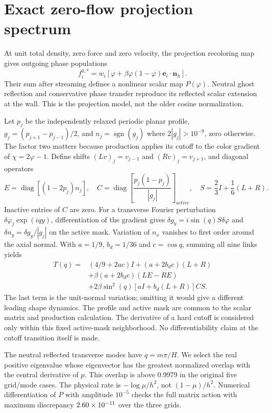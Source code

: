\section{Exact zero-flow projection spectrum}
\label{supp:phasespectrum}
At unit total density, zero force and zero velocity, the projection
recoloring map gives outgoing phase populations
\begin{equation}
 f_i^{0,*}=w_i[\varphi+\beta\varphi(1-\varphi)\bm e_i\cdot\bm n_h].
\end{equation}
Their sum after streaming defines a nonlinear scalar map $P(\varphi)$.
Neutral ghost reflection and conservative phase transfer reproduce its
reflected scalar extension at the wall. This is the projection model,
not the older cosine normalization.

Let $p_j$ be the independently relaxed periodic planar profile,
$g_j=(p_{j+1}-p_{j-1})/2$, and $n_j=\operatorname{sgn}(g_j)$ where
$2|g_j|>10^{-9}$, zero otherwise. The factor two matters because production
applies its cutoff to the color gradient of $\chi=2\varphi-1$.
Define shifts $(Lv)_j=v_{j-1}$ and $(Rv)_j=v_{j+1}$, and diagonal operators
\begin{equation}
 E=\operatorname{diag}[(1-2p_j)n_j],\quad
 C=\operatorname{diag}\left[\frac{p_j(1-p_j)}{|g_j|}\right]_{active},
 \quad S=\frac23 I+\frac16(L+R).
\end{equation}
Inactive entries of $C$ are zero. For a transverse Fourier perturbation
$\delta\varphi_j\exp(iqy)$, differentiation of the gradient gives
$\delta g_y=i\sin(q)S\delta\varphi$ and
$\delta n_y=\delta g_y/|g_j|$ on the active mask. Variation of $n_x$
vanishes to first order around the axial normal. With $a=1/9$, $b_d=1/36$
and $c=\cos q$, summing all nine links yields
\begin{align}\label{eq:exactsymbol}
 T(q)={}&(4/9+2ac)I+(a+2b_dc)(L+R)\nonumber\\
 &+\beta(a+2b_dc)(LE-RE)\nonumber\\
 &+2\beta\sin^2(q)[aI+b_d(L+R)]CS.
\end{align}
The last term is the unit-normal variation; omitting it would give a
different leading shape dynamics. The profile and active mask are common
to the scalar matrix and production calculation. The derivative of a
hard cutoff is considered only within this fixed active-mask neighborhood.
No differentiability claim at the cutoff transition itself is made.

The neutral reflected transverse modes have $q=m\pi/H$. We select the
real positive eigenvalue whose eigenvector has the greatest normalized
overlap with the central derivative of $p$. This overlap is above 0.9979
in the original five grid/mode cases. The physical rate is $-\log\mu/h^2$, not
$(1-\mu)/h^2$. Numerical differentiation of $P$ with amplitude $10^{-5}$
checks the full matrix action with maximum discrepancy
$2.60\times10^{-11}$ over the three grids.


